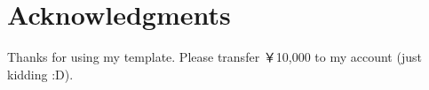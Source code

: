 \chapter*{Acknowledgments}
Thanks for using my template. Please transfer ￥10,000 to my account (just kidding :D).